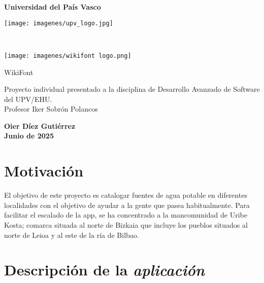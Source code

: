 \documentclass[11pt,a4paper]{article}
\begin{document}
\begin{titlepage}
 \vfill
  \begin{center}
   {\Huge\textbf{Universidad del País Vasco}} \\[1.5cm]
   
   \begin{minipage}[t]{0.5\textwidth}
   \centering
   \texttt{[image: imagenes/upv\_logo.jpg]}
   \end{minipage}
   \\ %
   \begin{minipage}[t]{0.5\textwidth}
   \centering
   \texttt{[image: imagenes/wikifont logo.png]}
   \end{minipage}
   
   \vfill

   {\huge WikiFont}\\[2.5cm]

   \hspace{.45\textwidth}
   \begin{minipage}{.5\textwidth}
   \large Proyecto individual presentado a la disciplina de Desarrollo Avanzado de Software del UPV/EHU.\\[1cm]

Profesor Iker Sobrón Polancos

  \end{minipage}
  \vfill

\vspace{2cm}

\large \textbf{Oier Díez Gutiérrez}\\

\large \textbf{Junio de 2025}
\end{center}
\end{titlepage}


\tableofcontents{}
\newpage

\section{Motivación}
El objetivo de este proyecto es catalogar fuentes de agua potable en diferentes localidades con el objetivo de ayudar a la gente que pasea habitualmente. Para facilitar el escalado de la app, se ha concentrado a la mancomunidad de Uribe Kosta; comarca situada al norte de Bizkaia que incluye los pueblos situados al norte de Leioa y al este de la ría de Bilbao.


\section{Descripción de la \textit{aplicación}}
\end{document}
